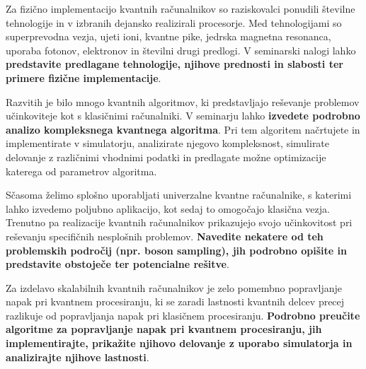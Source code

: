 Za fizično implementacijo kvantnih računalnikov so raziskovalci ponudili številne tehnologije in v izbranih dejansko realizirali procesorje. Med tehnologijami so superprevodna vezja, ujeti ioni, kvantne pike, jedrska magnetna resonanca, uporaba fotonov, elektronov in številni drugi predlogi. V seminarski nalogi lahko \textbf{predstavite predlagane tehnologije, njihove prednosti in slabosti ter primere fizične implementacije}.

Razvitih je bilo mnogo kvantnih algoritmov, ki predstavljajo reševanje problemov učinkoviteje kot s klasičnimi računalniki. V seminarju lahko \textbf{izvedete podrobno analizo kompleksnega kvantnega algoritma}. Pri tem algoritem načrtujete in implementirate v simulatorju, analizirate njegovo kompleksnost, simulirate delovanje z različnimi vhodnimi podatki in predlagate možne optimizacije katerega od parametrov algoritma.

Sčasoma želimo splošno uporabljati univerzalne kvantne računalnike, s katerimi lahko izvedemo poljubno aplikacijo, kot sedaj to omogočajo klasična vezja. Trenutno pa realizacije kvantnih računalnikov prikazujejo svojo učinkovitost pri reševanju specifičnih nesplošnih problemov. \textbf{Navedite nekatere od teh problemskih področij (npr. boson sampling), jih podrobno opišite in predstavite obstoječe ter potencialne rešitve}.

Za izdelavo skalabilnih kvantnih računalnikov je zelo pomembno popravljanje napak pri kvantnem procesiranju, ki se zaradi lastnosti kvantnih delcev precej razlikuje od popravljanja napak pri klasičnem procesiranju. \textbf{Podrobno preučite algoritme za popravljanje napak pri kvantnem procesiranju, jih implementirajte, prikažite njihovo delovanje z uporabo simulatorja in analizirajte njihove lastnosti}.

